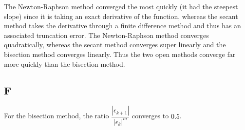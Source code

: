 \documentclass{article}
\begin{document}
The Newton-Raphson method converged the most quickly (it had the steepest slope) since it is taking an exact derivative of the function, whereas the secant method takes the derivative through a finite difference method and thus has an associated truncation error.  The Newton-Raphson method converges quadratically, whereas the secant method converges super linearly and the bisection method converges linearly.  Thus the two open methods converge far more quickly than the bisection method.


\subsection*{F}

For the bisection method, the ratio $ \dfrac{ |\epsilon_{k+1} |}{|\epsilon_k|^m} $ converges to $ 0.5 $.  
\end{document}
